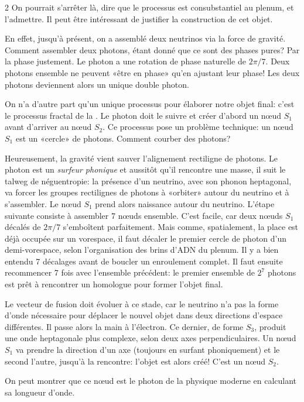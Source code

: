 \begin{multicols}{2}
On pourrait s'arrêter là, dire que le processus est consubstantiel au
plenum, et l'admettre. Il peut être intéressant de justifier la
construction de cet objet.

En effet, jusqu'à présent, on a assemblé deux neutrinos via la force
de gravité. Comment assembler deux photons, étant donné que ce sont
des phases pures? Par la phase justement. Le photon a une rotation de
phase naturelle de $2\pi/7$. Deux photons ensemble ne peuvent «être en
phase» qu'en ajustant leur phase! Les deux photons deviennent alors
un unique double photon.

On n'a d'autre part qu'un unique processus pour élaborer notre objet
final: c'est le processus fractal de la \PQ. Le photon doit le suivre
et créer d'abord un nœud $S_1$ avant d'arriver au nœud $S_2$. Ce processus
pose un problème technique: un nœud $S_1$ est un «cercle» de photons.
Comment courber des photons?

Heureusement, la gravité vient sauver l'alignement rectiligne de
photons. Le photon est un \textit{surfeur phonique} et aussitôt qu'il rencontre
une masse, il suit le talweg de néguentropie: la présence d'un
neutrino, avec son phonon heptagonal, va forcer les groupes
rectilignes de photons à «orbiter» autour du neutrino et à
s'assembler. Le nœud $S_1$ prend alors naissance autour du neutrino.
L'étape suivante consiste à assembler 7 nœuds ensemble. C'est facile,
car deux nœuds $S_1$ décalés de $2\pi/7$ s'emboîtent parfaitement. Mais
comme, spatialement, la place est déjà occupée sur un vorespace, il
faut décaler le premier cercle de photon d'un demi-vorespace, selon
l'organisation des brins d'ADN du plenum. Il y a bien entendu 7
décalages avant de boucler un enroulement complet. Il faut ensuite
recommencer 7 fois avec l'ensemble précédent: le premier ensemble de
$2^7$ photons est prêt à rencontrer un homologue pour former l'objet
final.

Le vecteur de fusion doit évoluer à ce stade, car le neutrino n'a pas
la forme d'onde nécessaire pour déplacer le nouvel objet dans deux
directions d'espace différentes. Il passe alors la main à
l'électron. Ce dernier, de forme $S_3$, produit une onde heptagonale
plus complexe, selon deux axes perpendiculaires. Un nœud $S_1$ va
prendre la direction d'un axe (toujours en surfant phoniquement) et le
second l'autre, jusqu'à la rencontre: l'objet est alors créé! C'est
un nœud $S_2$.
\medskip

On peut montrer que ce nœud est le photon de la physique moderne en
calculant sa longueur d'onde.


\end{multicols}
